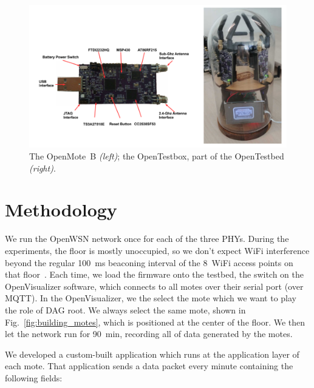 \documentclass[sensors,article,submit,moreauthors,pdftex]{Definitions/mdpi}
\begin{document}
\begin{figure}
	\centering
	\includegraphics[width=0.90\columnwidth]{mote_ot}
	\caption{
	    The OpenMote~B \textit{(left)}; the OpenTestbox, part of the OpenTestbed \textit{(right)}.
	}
    \label{fig:mote_ot}
\end{figure}

\section{Methodology}
\label{sec:methodology}


We run the OpenWSN network once for each of the three PHYs.
During the experiments, the floor is mostly unoccupied, so we don't expect WiFi interference beyond the regular 100~ms beaconing interval of the 8~WiFi access points on that floor~\cite{munoz18overview}.
Each time, we load the firmware onto the testbed, the switch on the OpenVisualizer software, which connects to all motes over their serial port (over MQTT).
In the OpenVisualizer, we the select the mote which we want to play the role of DAG root.
We always select the same mote, shown in Fig.~\ref{fig:building_motes}, which is positioned at the center of the floor.
We then let the network run for 90~min, recording all of data generated by the motes.


We developed a custom-built application which runs at the application layer of each mote.
That application sends a data packet every minute containing the following fields:
\end{document}
